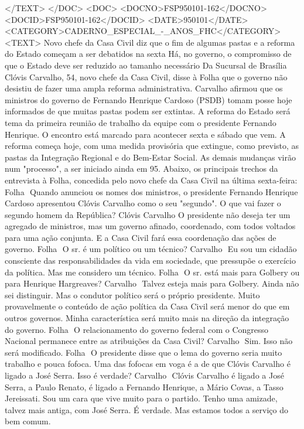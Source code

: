 </TEXT>
</DOC>
<DOC>
<DOCNO>FSP950101-162</DOCNO>
<DOCID>FSP950101-162</DOCID>
<DATE>950101</DATE>
<CATEGORY>CADERNO_ESPECIAL_-_ANOS_FHC</CATEGORY>
<TEXT>
Novo chefe da Casa Civil diz que o fim de algumas pastas e a reforma do Estado começam a ser debatidos na sexta 
Há, no governo, o compromisso de que o Estado deve ser reduzido ao tamanho necessário 
Da Sucursal de Brasília 
Clóvis Carvalho, 54, novo chefe da Casa Civil, disse à Folha que o governo não desistiu de fazer uma ampla reforma administrativa.
Carvalho afirmou que os ministros do governo de Fernando Henrique Cardoso (PSDB) tomam posse hoje informados de que muitas pastas podem ser extintas.
A reforma do Estado será tema da primeira reunião de trabalho da equipe com o presidente Fernando Henrique. O encontro está marcado para acontecer sexta e sábado que vem.
A reforma começa hoje, com uma medida provisória que extingue, como previsto, as pastas da Integração Regional e do Bem-Estar Social. As demais mudanças virão num "processo", a ser iniciado ainda em 95.
Abaixo, os principais trechos da entrevista à Folha, concedida pelo novo chefe da Casa Civil na última sexta-feira:
Folha  Quando anunciou os nomes dos ministros, o presidente Fernando Henrique Cardoso apresentou Clóvis Carvalho como o seu "segundo". O que vai fazer o segundo homem da República?
Clóvis Carvalho  O presidente não deseja ter um agregado de ministros, mas um governo afinado, coordenado, com todos voltados para uma ação conjunta. E a Casa Civil fará essa coordenação das ações de governo.
Folha  O sr. é um político ou um técnico?
Carvalho  Eu sou um cidadão consciente das responsabilidades da vida em sociedade, que pressupõe o exercício da política. Mas me considero um técnico.
Folha  O sr. está mais para Golbery ou para Henrique Hargreaves?
Carvalho  Talvez esteja mais para Golbery. Ainda não sei distinguir. Mas o condutor político será o próprio presidente.
Muito provavelmente o conteúdo de ação política da Casa Civil será menor do que em outros governos. Minha característica será muito mais na direção da integração do governo.
Folha  O relacionamento do governo federal com o Congresso Nacional permanece entre as atribuições da Casa Civil?
Carvalho  Sim. Isso não será modificado.
Folha  O presidente disse que o lema do governo seria muito trabalho e pouca fofoca. Uma das fofocas em voga é a de que Clóvis Carvalho é ligado a José Serra. Isso é verdade?
Carvalho  Clóvis Carvalho é ligado a José Serra, a Paulo Renato, é ligado a Fernando Henrique, a Mário Covas, a Tasso Jereissati. Sou um cara que vive muito para o partido. Tenho uma amizade, talvez mais antiga, com José Serra. É verdade. Mas estamos todos a serviço do bem comum.
